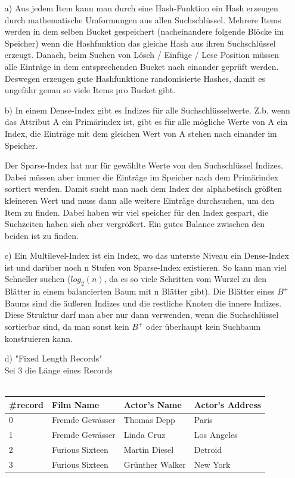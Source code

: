 \begin{enumerate}

    \item[a)]
    Aus jedem Item kann man durch eine Hash-Funktion ein Hash erzeugen durch mathematische Umformungen aus allen Suchschlüssel. Mehrere Items werden in dem selben Bucket gespeichert (nacheinandere folgende Blöcke im Speicher) wenn die Hashfunktion das gleiche Hash aus ihren Suchschlüssel erzeugt. Danach, beim Suchen von Lösch / Einfüge / Lese Position müssen alle Einträge in dem entsprechenden Bucket nach einander geprüft werden. Deswegen erzeugen gute Hashfunktione randomisierte Hashes, damit es ungefähr genau so viele Items pro Bucket gibt.

    \item[b)]
    In einem Dense-Index gibt es Indizes für alle Suchschlüsselwerte. Z.b. wenn das Attribut A ein Primärindex ist, gibt es für alle mögliche Werte von A ein Index, die Einträge mit dem gleichen Wert von A stehen nach einander im Speicher.

    Der Sparse-Index hat nur für gewählte Werte von den Suchschlüssel Indizes. Dabei müssen aber immer die Einträge im Speicher nach dem Primärindex sortiert werden. Damit sucht man nach dem Index des alphabetisch größten kleineren Wert und muss dann alle weitere Einträge durchsuchen, um den Item zu finden. Dabei haben wir viel speicher für den Index gespart, die Suchzeiten haben sich aber vergrößert. Ein gutes Balance zwischen den beiden ist zu finden.

    \item[c)]
    Ein Multilevel-Index ist ein Index, wo das unterste Niveau ein Dense-Index ist und darüber noch n Stufen von Sparse-Index existieren. So kann man viel Schneller suchen ($log_2(n)$, da es so viele Schritten vom Wurzel zu den Blätter in einem balancierten Baum mit n Blätter gibt). Die Blätter eines $B^{+}$ Baums sind die äußeren Indizes und die restliche Knoten die innere Indizes. Diese Struktur darf man aber nur dann verwenden, wenn die Suchschlüssel sortierbar sind, da man sonst kein $B^{+}$ oder überhaupt kein Suchbaum konstruieren kann.

    \item[d)]
    "Fixed Length Records" \\
    Sei 3 die Länge eines Records \\ \\
    \begin{tabular}{ l | l | l | l |}
    \hline
    \#record & Film Name & Actor's Name & Actor's Address \\ \hline
    0 & Fremde Gewässer & Thomas Depp & Paris \\ \hline
    1 & Fremde Gewässer & Linda Cruz & Los Angeles \\ \hline
    2 & Furious Sixteen & Martin Diesel & Detroid \\ \hline
    3 & Furious Sixteen & Grünther Walker & New York
    \end{tabular}


\end{enumerate}
